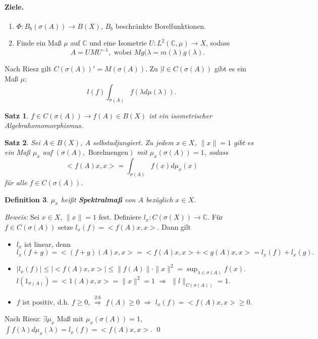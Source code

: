 \documentclass[12pt]{extreport} %
\newtheorem{Satz}{Satz}[subsection]
\newtheorem{Definition}[Satz]{Definition}
\numberwithin{equation}{section}
\newcommand{\C}{\mathbb{C}} %
\newcommand{\m}{\cdot}
\newcommand{\Bew}{\emph{Beweis: }}
\begin{document}
	\paragraph{Ziele.} 
	\begin{enumerate}[1)]
		\item $\Phi: B_b(\sigma(A)) \rightarrow B(X)$, $B_b$ beschränkte Borelfunktionen.
		\item Finde ein Maß $\mu$ auf $\C$ und eine Isometrie $U: L^2(\C,\mu)\rightarrow X$, sodass 
		$$A=UMU^{-1},\text{ wobei } Mg(\lambda = m(\lambda)g(\lambda).$$
	\end{enumerate}
	
	Nach Riesz gilt $C(\sigma(A))' = M(\sigma(A))$. Zu $|l\in C(\sigma(A))$ gibt es ein Maß $\mu$:
	$$l(f)\int_{\sigma(A)}f(\lambda d\mu(\lambda)).$$
	
	\begin{Satz}
		$f\in C(\sigma(A))\rightarrow f(A)\in B(X)$ ist ein isometrischer Algebrahomomorphismus.
	\end{Satz}
	
	\begin{Satz}
		Sei $A\in B(X)$, $A$ selbstadjungiert. Zu jedem $x\in X$, $\|x\| = 1$ gibt es ein Maß $\mu_x$ auf $(\sigma(A),\text{ Borelmengen})$ mit $\mu_x(\sigma(A)) = 1$, sodass
		$$\boxed{<f(A) x,x> = \int_{\sigma(A)}f(x) d\mu_x(x) }$$
		für alle $f\in C(\sigma(A))$.
	\end{Satz}
	
	\begin{Definition}
		$\mu_x$ heißt \textbf{Spektralmaß} von $A$ bezüglich $x\in X$.
	\end{Definition}
	
	\Bew Sei $x\in X$, $\|x\| = 1$ fest. Definiere $l_x:C(\sigma(X))\rightarrow\C$. Für $f\in C(\sigma(A))$ setze $l_x(f) = <f(A) x,x>$. Dann gilt 
	\begin{itemize}
		\item $l_x$ ist linear, denn 
		$$l_x(f+g) = <(f+g)(A)x,x> = <f(A)x,x> + <g(A)x,x> = l_x(f)+l_x(g).$$
		\item $|l_x(f)|\leq |<f(A)x,x>|\leq \|f(A)\|\m\|x\|^2 = \sup_{\lambda\in \sigma(A)}f(x)$. \\
		$l(1_{\sigma(A)}) = <1(A)x,x> = \|x\|^2 = 1$ $\Rightarrow$ $\|l\|_{C(\sigma(A))} = 1$.
		\item $f$ ist positiv, d.h. $f\geq 0$, $\overset{2.6}{\Rightarrow}$ $f(A)\geq 0$ $\Rightarrow$ $l_x(f) = <f(A)x,x> \geq 0$.
	\end{itemize}
	Nach Riesz: $\exists \mu_x$ Maß mit $\mu_x(\sigma(A)) = 1$, $\int f(\lambda)d\mu_x(\lambda) = l_x(f) = <f(A)x,x>$.
	\qed
	
\end{document}
